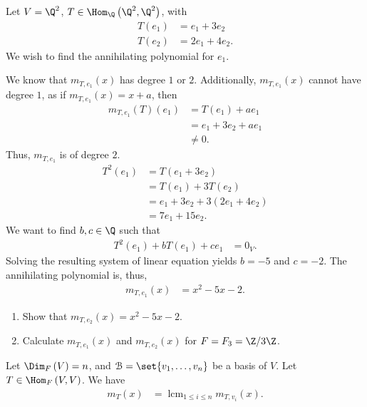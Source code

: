 \documentclass[10pt]{mypackage}
\DeclareMathOperator*{\lcm}{lcm}
\begin{document}
\begin{example}
  Let $V = \Q^2$, $T\in \Hom_{\Q}\left(\Q^2,\Q^2\right)$, with
  \begin{align*}
    T\left(e_1\right) &= e_1 + 3e_2\\
    T\left(e_2\right) &= 2e_1 + 4e_2.
  \end{align*}
  We wish to find the annihilating polynomial for $e_1$.\newline

  We know that $m_{T,e_1}(x)$ has degree $1$ or $2$. Additionally, $m_{T,e_1}(x)$ cannot have degree $1$, as if $m_{T,e_1}\left(x\right) = x+a$, then
  \begin{align*}
    m_{T,e_1}\left(T\right)\left(e_1\right) &= T\left(e_1\right) + ae_1\\
                                            &= e_1 + 3e_2 + ae_1\\
                                            &\neq 0.
  \end{align*}
  Thus, $m_{T,e_1}$ is of degree $2$.
  \begin{align*}
    T^2\left(e_1\right) &= T\left(e_1 + 3e_2\right)\\
                        &= T\left(e_1\right) + 3T\left(e_2\right)\\
                        &= e_1 + 3e_2 + 3\left(2e_1 + 4e_2\right)\\
                        &= 7e_1 + 15 e_2.
  \end{align*}
  We want to find $b,c\in \Q$ such that
  \begin{align*}
    T^2\left(e_1\right) + bT\left(e_1\right) + ce_1 &= 0_V.
  \end{align*}
  Solving the resulting system of linear equation yields $b = -5$ and $c = -2$. The annihilating polynomial is, thus,
  \begin{align*}
    m_{T,e_1}(x) &= x^2 - 5x - 2.
  \end{align*}
\end{example}
\begin{exercise}\hfill
  \begin{enumerate}[(1)]
    \item Show that $m_{T,e_2}(x) = x^2 - 5x - 2$.
    \item Calculate $m_{T,e_1}(x)$ and $m_{T,e_2}(x)$ for $F = F_3 = \Z/3\Z$.
  \end{enumerate}
\end{exercise}
\begin{theorem}
  Let $\Dim_{F}\left(V\right) = n$, and $\mathcal{B} = \set{v_1,\dots,v_n}$ be a basis of $V$. Let $T\in \Hom_{F}\left(V,V\right)$. We have
  \begin{align*}
    m_{T}\left(x\right) &= \lcm_{1 \leq i \leq n}m_{T,v_i}\left(x\right).
  \end{align*}
\end{theorem}
\end{document}
